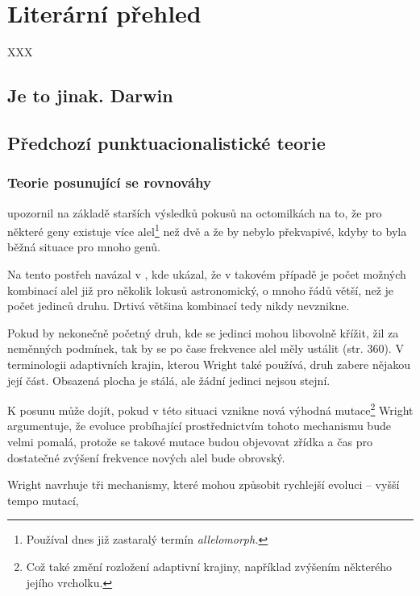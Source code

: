\chapter{Literární přehled}


XXX

%
\section{Je to jinak. Darwin}

\section{Předchozí punktuacionalistické teorie}

\subsection{Teorie posunující se rovnováhy}

\citet[str. 104--105]{wright1931} upozornil na základě starších výsledků pokusů na octomilkách na to, že pro některé
geny existuje více alel\footnote{Používal dnes již zastaralý termín \textit{allelomorph.}} než dvě a že by nebylo
překvapivé, kdyby to byla běžná situace pro mnoho genů.

Na tento postřeh navázal v \citet[str. 356]{wright1932}, kde ukázal, že v takovém případě je počet možných kombinací
alel již pro několik lokusů astronomický, o mnoho řádů větší, než je počet jedinců druhu. Drtivá většina kombinací
tedy nikdy nevznikne.

Pokud by nekonečně početný druh, kde se jedinci mohou libovolně křížit, žil za neměnných podmínek, tak by se po čase
frekvence alel měly ustálit (str. 360). V terminologii adaptivních krajin, kterou Wright také používá, druh
zabere nějakou její část. Obsazená plocha je stálá, ale žádní jedinci nejsou stejní.

K posunu může dojít, pokud v této situaci vznikne nová výhodná mutace\footnote{Což také změní rozložení adaptivní
krajiny, například zvýšením některého jejího vrcholku.} Wright argumentuje, že evoluce probíhající prostřednictvím
tohoto mechanismu bude velmi pomalá, protože se takové mutace budou objevovat zřídka a čas pro dostatečné zvýšení
frekvence nových alel bude obrovský.

Wright navrhuje tři mechanismy, které mohou způsobit rychlejší evoluci -- vyšší tempo mutací,

